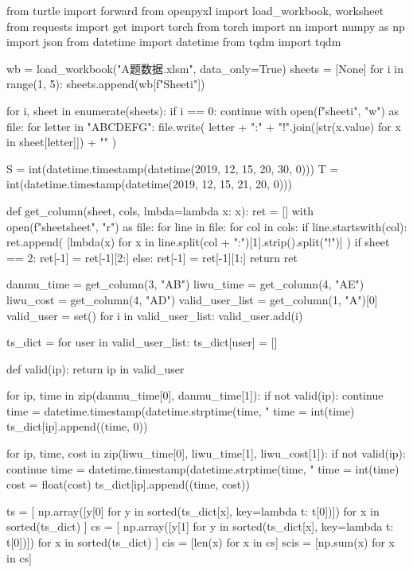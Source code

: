 \documentclass{article} %
\begin{document}
\begin{python}
from turtle import forward
from openpyxl import load_workbook, worksheet
from requests import get
import torch
from torch import nn
import numpy as np
import json
from datetime import datetime
from tqdm import tqdm

wb = load_workbook("A题数据.xlsm", data_only=True)
sheets = [None]
for i in range(1, 5):
    sheets.append(wb[f"Sheet{i}"])

for i, sheet in enumerate(sheets):
    if i == 0:
        continue
    with open(f"sheet{i}", "w") as file:
        for letter in "ABCDEFG":
            file.write(
                letter + ":" + "!".join([str(x.value) for x in sheet[letter]]) + "\n"
            )

S = int(datetime.timestamp(datetime(2019, 12, 15, 20, 30, 0)))
T = int(datetime.timestamp(datetime(2019, 12, 15, 21, 20, 0)))


def get_column(sheet, cols, lmbda=lambda x: x):
    ret = []
    with open(f"sheet{sheet}", "r") as file:
        for line in file:
            for col in cols:
                if line.startswith(col):
                    ret.append(
                        [lmbda(x) for x in line.split(col + ":")[1].strip().split("!")]
                    )
                    if sheet == 2:
                        ret[-1] = ret[-1][2:]
                    else:
                        ret[-1] = ret[-1][1:]
    return ret


danmu_time = get_column(3, "AB")
liwu_time = get_column(4, "AE")
liwu_cost = get_column(4, "AD")
valid_user_list = get_column(1, "A")[0]
valid_user = set()
for i in valid_user_list:
    valid_user.add(i)

ts_dict = {}
for user in valid_user_list:
    ts_dict[user] = []


def valid(ip):
    return ip in valid_user


for ip, time in zip(danmu_time[0], danmu_time[1]):
    if not valid(ip):
        continue
    time = datetime.timestamp(datetime.strptime(time, "%
    time = int(time)
    ts_dict[ip].append((time, 0))

for ip, time, cost in zip(liwu_time[0], liwu_time[1], liwu_cost[1]):
    if not valid(ip):
        continue
    time = datetime.timestamp(datetime.strptime(time, "%
    time = int(time)
    cost = float(cost)
    ts_dict[ip].append((time, cost))

ts = [
    np.array([y[0] for y in sorted(ts_dict[x], key=lambda t: t[0])])
    for x in sorted(ts_dict)
]
cs = [
    np.array([y[1] for y in sorted(ts_dict[x], key=lambda t: t[0])])
    for x in sorted(ts_dict)
]
cis = [len(x) for x in cs]
scis = [np.sum(x) for x in cs]


\end{python}
\end{document}
